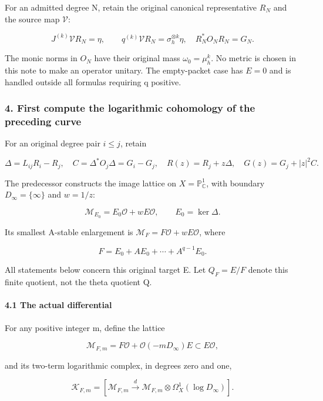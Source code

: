 For an admitted degree N, retain the original canonical representative \(R_N\) and the source map \(\mathcal V\):

\[
J^{(k)}\mathcal V R_N=\eta,\qquad
q^{(k)}\mathcal V R_N=\sigma_h^{\otimes k}\eta,
\quad R_N^*O_NR_N=G_N.
\tag{6}
\]

The monic norms in \(O_N\) have their original mass \(\omega_0=\mu_h^k\). No metric is chosen in this note to make an operator unitary. The empty-packet case has \(E=0\) and is handled outside all formulas requiring q positive.

\subsubsection{4. First compute the logarithmic cohomology of the preceding curve}\label{endpoint-exponential_original--first-compute-the-logarithmic-cohomology-of-the-preceding-curve}

For an original degree pair \(i\le j\), retain

\[
\Delta=L_{ij}R_i-R_j,\quad C=\Delta^*O_j\Delta=G_i-G_j,
\quad R(z)=R_j+z\Delta,
\quad G(z)=G_j+|z|^2C.
\tag{7}
\]

The predecessor constructs the image lattice on \(X=\mathbb P^1_{\mathbb C}\), with boundary \(D_\infty=\{\infty\}\) and \(w=1/z\):

\[
\mathcal M_{E_0}=E_0\mathcal O+wE\mathcal O,\qquad E_0=\ker\Delta.
\tag{8}
\]

Its smallest A-stable enlargement is \(\mathcal M_F=F\mathcal O+wE\mathcal O\), where

\[
F=E_0+AE_0+\cdots+A^{q-1}E_0.
\tag{9}
\]

All statements below concern this original target E. Let \(Q_F=E/F\) denote this finite quotient, not the theta quotient Q.

\paragraph{4.1 The actual differential}\label{endpoint-exponential_original--the-actual-differential}

For any positive integer m, define the lattice

\[
\mathcal M_{F,m}=F\mathcal O+\mathcal O(-mD_\infty)E
\subset E\mathcal O,
\tag{10}
\]

and its two-term logarithmic complex, in degrees zero and one,

\[
\mathcal K_{F,m}=
[\mathcal M_{F,m}\xrightarrow{d}
 \mathcal M_{F,m}\otimes\Omega_X^1(\log D_\infty)].
\tag{11}
\]

